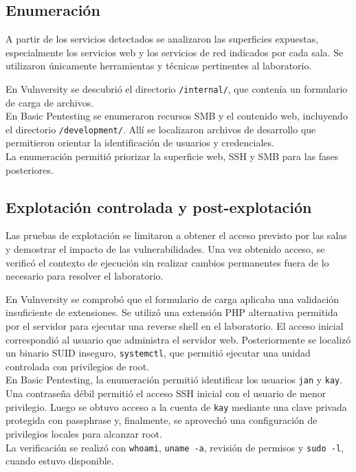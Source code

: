 \documentclass[11pt,a4paper]{article}
\begin{document}
\subsection{Enumeración}
A partir de los servicios detectados se analizaron las superficies expuestas, especialmente los servicios web y los servicios de red indicados por cada sala. Se utilizaron únicamente herramientas y técnicas pertinentes al laboratorio.

\begin{campo}
En Vulnversity se descubrió el directorio \texttt{/internal/}, que contenía un formulario de carga de archivos.\\
En Basic Pentesting se enumeraron recursos SMB y el contenido web, incluyendo el directorio \texttt{/development/}. Allí se localizaron archivos de desarrollo que permitieron orientar la identificación de usuarios y credenciales.\\
La enumeración permitió priorizar la superficie web, SSH y SMB para las fases posteriores.
\end{campo}

\subsection{Explotación controlada y post-explotación}
Las pruebas de explotación se limitaron a obtener el acceso previsto por las salas y demostrar el impacto de las vulnerabilidades. Una vez obtenido acceso, se verificó el contexto de ejecución sin realizar cambios permanentes fuera de lo necesario para resolver el laboratorio.

\begin{campo}
En Vulnversity se comprobó que el formulario de carga aplicaba una validación insuficiente de extensiones. Se utilizó una extensión PHP alternativa permitida por el servidor para ejecutar una reverse shell en el laboratorio. El acceso inicial correspondió al usuario que administra el servidor web. Posteriormente se localizó un binario SUID inseguro, \texttt{systemctl}, que permitió ejecutar una unidad controlada con privilegios de root.\\
En Basic Pentesting, la enumeración permitió identificar los usuarios \texttt{jan} y \texttt{kay}. Una contraseña débil permitió el acceso SSH inicial con el usuario de menor privilegio. Luego se obtuvo acceso a la cuenta de \texttt{kay} mediante una clave privada protegida con passphrase y, finalmente, se aprovechó una configuración de privilegios locales para alcanzar root.\\
La verificación se realizó con \texttt{whoami}, \texttt{uname -a}, revisión de permisos y \texttt{sudo -l}, cuando estuvo disponible.
\end{campo}
\end{document}
